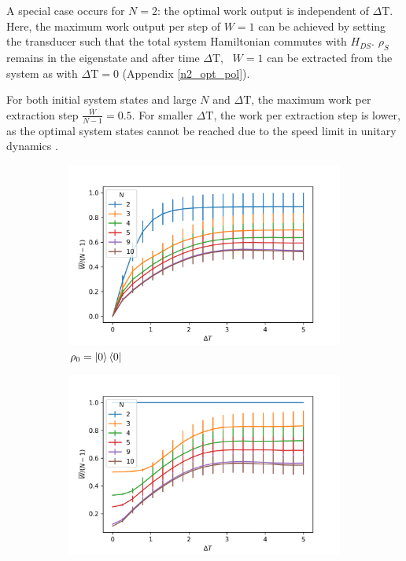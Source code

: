 A special case occurs for $N = 2$: the optimal work output is independent of $\Delta \mathrm{T}$.
Here, the maximum work output per step of $W = 1$ can be achieved by setting the transducer such that the total system Hamiltonian commutes with $H_{DS}$. $\rho_S$ remains in the eigenstate and after time $\Delta \mathrm{T}$, \ $W = 1$ can be extracted from the system as with $\Delta \mathrm{T} = 0$ (Appendix \ref{n2_opt_pol}).

For both initial system states and large $N$ and $\Delta \mathrm{T}$, the maximum work per extraction step $\frac{\overline{W}}{N-1} = 0.5$.
For smaller $\Delta \mathrm{T}$, the work per extraction step is lower, as the optimal system states cannot be reached due to the speed limit in unitary dynamics \cite{Deffner_2017, PhysRevA.67.052109}.

\begin{figure}[h]
	\centering
	\begin{subfigure}{0.4\textwidth}
		\centering
		\includegraphics[width=\textwidth]{img/dt_0}
		\caption{$\rho_0 = \ket{0}\bra{0}$}
		\label{dt_0}
	\end{subfigure}
	\begin{subfigure}{0.4\textwidth}
	\centering
	\includegraphics[width=\textwidth]{img/dt_eigen}

\end{subfigure}
\end{figure}
